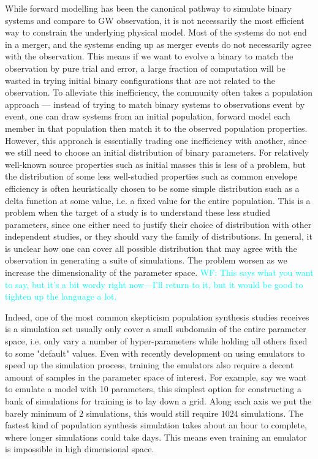 \documentclass[twocolumn]{aastex631}
\newcommand{\wf}[1]{\textcolor{cyan}{WF: #1}}
\begin{document}
While forward modelling has been the canonical pathway to simulate binary systems and compare to GW observation,
it is not necessarily the most efficient way to constrain the underlying physical model.
Most of the systems do not end in a merger, and the systems ending up as merger events do not necessarily agree with the observation.
This means if we want to evolve a binary to match the observation by pure trial and error, a large fraction of computation will be wasted in trying initial binary configurations that are not related to the observation.
To alleviate this inefficiency, the community often takes a population approach --- instead of trying to match binary systems to observations event by event,
one can draw systems from an initial population, forward model each member in that population then match it to the observed population properties.
However, this approach is essentially trading one inefficiency with another, since we still need to choose an initial distribution of binary parameters.
For relatively well-known source properties such as initial masses this is less of a problem,
but the distribution of some less well-studied properties such as common envelope efficiency is often heuristically chosen to be some simple distribution such as a delta function at some value, i.e. a fixed value for the entire population.
This is a problem when the target of a study is to understand these less studied parameters, since one either need to justify their choice of distribution with other independent studies,
or they should vary the family of distributions.
In general, it is unclear how one can cover all possible distribution that may agree with the observation in generating a suite of simulations.
The problem worsen as we increase the dimensionality of the parameter space.
\wf{This says what you want to say, but it's a bit wordy right now---I'll return to it, but it would be good to tighten up the language a lot.}

Indeed, one of the most common skepticism population synthesis studies receives is a simulation set usually only cover a small subdomain of the entire parameter space,
i.e. only vary a number of hyper-parameters while holding all others fixed to some "default" values.
Even with recently development on using emulators to speed up the simulation process, training the emulators also require a decent amount of samples in the parameter space of interest.
For example, say we want to emulate a model with 10 parameters, this simplest option for constructing a bank of simulations for training is to lay down a grid. Along each axis we put the barely minimum of $2$ simulations, this would still require $1024$ simulations.
The fastest kind of population synthesis simulation takes about an hour to complete, where longer simulations could take days.
This means even training an emulator is impossible in high dimensional space.
\end{document}
